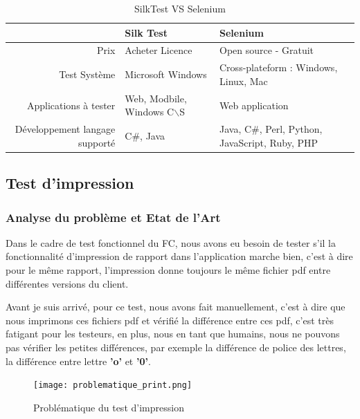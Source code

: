     \begin{table}[H]
        \centering
        \begin{tabular}{|r|m{5cm}|m{5cm}|}
        \hline
        & \Large{\textbf{Silk Test}} & \Large{\textbf{Selenium}} \\
        \hline
            Prix & Acheter Licence & Open source - Gratuit \\
        \hline
            Test Système & Microsoft Windows & Cross-plateform : Windows, Linux, Mac\\
        \hline 
            Applications à tester & Web, Modbile, Windows C$\backslash$S & Web application\\
        \hline
            Développement langage supporté & C\#, Java & Java, C\#, Perl, Python, JavaScript, Ruby, PHP\\
        \hline
        \end{tabular}
        \caption{SilkTest VS Selenium}
        \label{tab:Silk_vs_Selenium_label}
    \end{table}
\newpage
\subsection{Test d'impression}
    \subsubsection{Analyse du problème et Etat de l'Art}
    Dans le cadre de test fonctionnel du FC, nous avons eu besoin de tester s'il la fonctionnalité d'impression de rapport dans l'application marche bien, c'est à dire pour le même rapport, l'impression donne toujours le même fichier pdf entre différentes versions du client.
    
    \par Avant je suis arrivé, pour ce test, nous avons fait manuellement, c'est à dire que nous imprimons ces fichiers pdf et vérifié la différence entre ces pdf, c'est très fatigant pour les testeurs, en plus, nous en tant que humains, nous ne pouvons pas vérifier les petites différences, par exemple la différence de police des lettres, la différence entre lettre \textbf{'o'} et \textbf{'0'}.
    \begin{figure}[H]
        \centering
        \texttt{[image: problematique\_print.png]}
        \caption{Problématique du test d'impression }
        \label{fig:prolematique_TestPrint_label}
    \end{figure}
    
